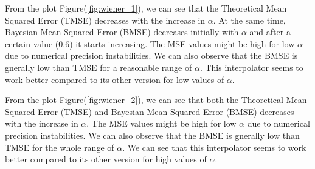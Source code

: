 \documentclass[a4 paper]{article}
\begin{document}
From the plot Figure(\ref{fig:wiener_1}), we can see that the Theoretical Mean Squared Error (TMSE) decreases with the increase in $\alpha$. At the same time, Bayesian Mean Squared Error (BMSE) decreases initially with $\alpha$ and after a certain value (0.6) it starts increasing. The MSE values might be high for low $\alpha$ due to numerical precision instabilities. We can also observe that the BMSE is gnerally low than TMSE for a reasonable range of $\alpha$. This interpolator seems to work better compared to its other version for low values of $\alpha$.


From the plot Figure(\ref{fig:wiener_2}), we can see that both the Theoretical Mean Squared Error (TMSE) and Bayesian Mean Squared Error (BMSE) decreases with the increase in $\alpha$. The MSE values might be high for low $\alpha$ due to numerical precision instabilities. We can also observe that the BMSE is gnerally low than TMSE for the whole range of $\alpha$. We can see that this interpolator seems to work better compared to its other version for high values of $\alpha$.



\newpage
{}
\end{document}
